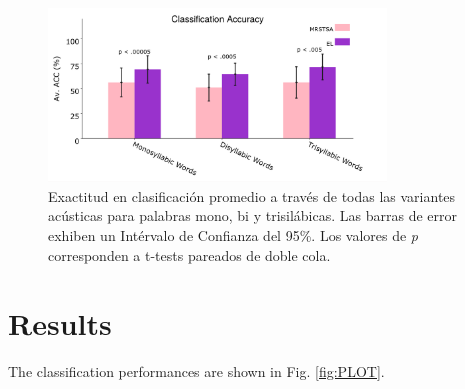 {\begin{figure}[h!]
    \centering
    \includegraphics[width=0.8\textwidth]{PLOT1.png}
    \caption{Exactitud en clasificación promedio a través de todas las variantes acústicas para palabras mono, bi y trisilábicas. Las barras de error exhiben un Intérvalo de Confianza del 95\%. Los valores de \emph{p} corresponden a t-tests pareados de doble cola.}
    \label{fig:PLOT1}
\end{figure}
}{
\section{Results}

The classification performances are shown in Fig. \ref{fig:PLOT}.

}
